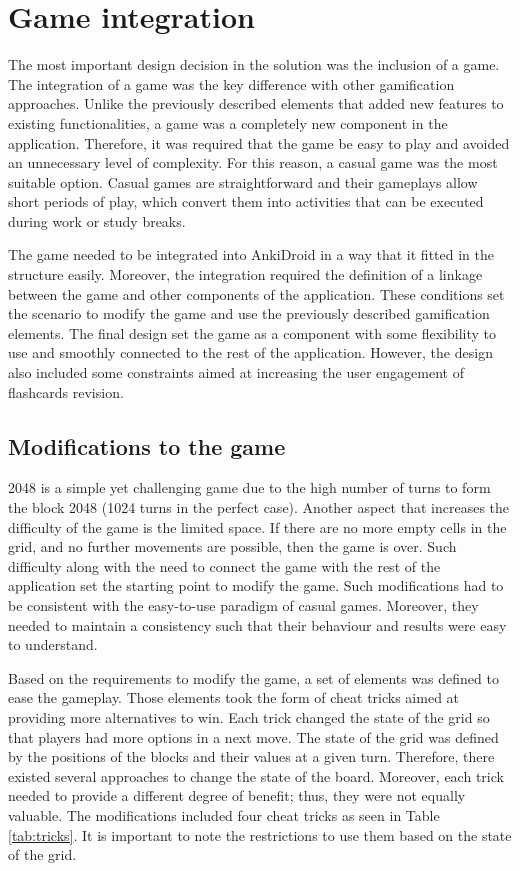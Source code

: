 \section{Game integration}
\label{game-integration}
The most important design decision in the solution was the inclusion of a game. The integration of a game was the key difference with other gamification approaches. Unlike the previously described elements that added new features to existing functionalities, a game was a completely new component in the application. Therefore, it was required that the game be easy to play and avoided an unnecessary level of complexity. For this reason, a casual game was the most suitable option. Casual games are straightforward and their gameplays allow short periods of play, which convert them into activities that can be executed during work or study breaks.

The game needed to be integrated into AnkiDroid in a way that it fitted in the structure easily. Moreover, the integration required the definition of a linkage between the game and other components of the application. These conditions set the scenario to modify the game and use the previously described gamification elements. The final design set the game as a component with some flexibility to use and smoothly connected to the rest of the application. However, the design also included some constraints aimed at increasing the user engagement of flashcards revision.

\subsection{Modifications to the game}
2048 is a simple yet challenging game due to the high number of turns to form the block 2048 (1024 turns in the perfect case). Another aspect that increases the difficulty of the game is the limited space. If there are no more empty cells in the grid, and no further movements are possible, then the game is over. Such difficulty along with the need to connect the game with the rest of the application set the starting point to modify the game. Such modifications had to be consistent with the easy-to-use paradigm of casual games. Moreover, they needed to maintain a consistency such that their behaviour and results were easy to understand.

Based on the requirements to modify the game, a set of elements was defined to ease the gameplay. Those elements took the form of cheat tricks aimed at providing more alternatives to win. Each trick changed the state of the grid so that players had more options in a next move. The state of the grid was defined by the positions of the blocks and their values at a given turn. Therefore, there existed several approaches to change the state of the board. Moreover, each trick needed to provide a different degree of benefit; thus, they were not equally valuable. The modifications included four cheat tricks as seen in Table \ref{tab:tricks}. It is important to note the restrictions to use them based on the state of the grid.

